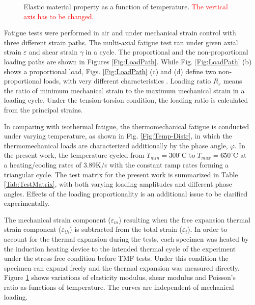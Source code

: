 \documentclass[preprint,5p,twocolumn,11pt,sort&compress]{elsarticle}
\newcommand{\marked}[1]{\textcolor{red}{#1}}
\begin{document}
\begin{figure}[!htp]
\caption{Elastic material property as a function of temperature. \marked{The vertical axis has to be changed.}}
\label{Fig:plot_elastic_by_temperature_in718}
\end{figure}

Fatigue tests were performed in air and under mechanical strain control with three different strain paths. The multi-axial fatigue test  ran under given axial strain $\varepsilon$ and shear strain $\gamma$ in a cycle. The proportional and the non-proportional loading paths are shown in Figures \ref{Fig:LoadPath}. While Fig. \ref{Fig:LoadPath} (b) shows a proportional load,  Figs. \ref{Fig:LoadPath} (c) and (d) define two non-proportional loads, with very different characteristics \cite{Socie1999}.
Loading ratio $R_\varepsilon$ means the ratio of minimum mechanical strain to the maximum mechanical strain in a loading cycle. Under the tension-torsion condition, the loading ratio is calculated from the principal strains.

In comparing with isothermal fatigue, the thermomechanical fatigue is conducted under varying temperature, as shown in Fig. \ref{Fig:Temp-Distr}, in which the thermomechanical loads are characterized additionally by the phase angle, $\varphi$. In the present work, the temperature cycled from $T_{min}=300^\circ$C to $T_{max}=650^\circ$C at a heating/cooling rates of 3.89K/s with the constant ramp rates forming a triangular cycle. The test matrix for the present work is summarized in Table \ref{Tab:TestMatrix}, with both varying loading amplitudes and different phase angles. Effects of the loading proportionality is an additional issue to be clarified experimentally.

The mechanical strain component ($\varepsilon_{m}$) resulting when the free expansion thermal strain component ($\varepsilon_{th}$) is subtracted from the total strain ($\varepsilon_{t}$). In order to account for the thermal expansion during the tests, each specimen was heated by the induction heating device to the intended thermal cycle of the experiment under the  stress free condition before TMF tests. Under this condition the specimen can expand freely and the thermal expansion was measured directly.
Figure \ref{Fig:plot_elastic_by_temperature_in718} shows variations of elasticity modulus, shear modulus and Poisson's ratio as functions of temperature. The curves are independent of mechanical loading.
\end{document}
